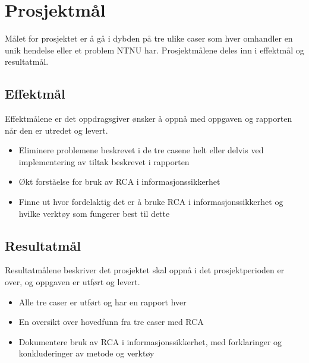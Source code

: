 \section{Prosjektmål}
\label{sec:prosjektmaal}
Målet for prosjektet er å gå i dybden på tre ulike caser som hver omhandler en unik hendelse eller et problem NTNU har. Prosjektmålene deles inn i effektmål og resultatmål.

\subsection{Effektmål}
Effektmålene er det oppdragsgiver ønsker å oppnå med oppgaven og rapporten når den er utredet og levert.
\begin{itemize}
    \item Eliminere problemene beskrevet i de tre casene helt eller delvis ved implementering av tiltak beskrevet i rapporten
    \item Økt forståelse for bruk av RCA i informasjonssikkerhet
    \item Finne ut hvor fordelaktig det er å bruke RCA i informasjonssikkerhet og hvilke verktøy som fungerer best til dette
\end{itemize}

\subsection{Resultatmål}
Resultatmålene beskriver det prosjektet skal oppnå i det prosjektperioden er over, og oppgaven er utført og levert.

\begin{itemize}
    \item Alle tre caser er utført og har en rapport hver
    \item En oversikt over hovedfunn fra tre caser med RCA
    \item Dokumentere bruk av RCA i informasjonssikkerhet, med forklaringer og konkluderinger av metode og verktøy
\end{itemize}